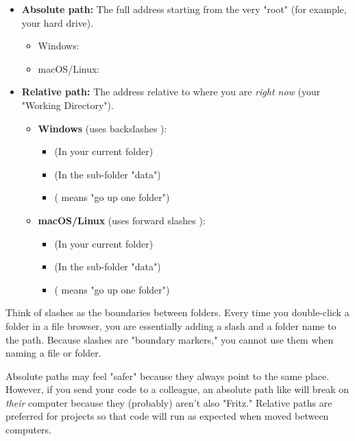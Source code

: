 \begin{itemize}
    \item \textbf{Absolute path:} The full address starting from the very "root" (for example, your hard drive). 
    \begin{itemize}
        \item Windows: 
        \item macOS/Linux: 
    \end{itemize}
    \item \textbf{Relative path:} The address relative to where you are \emph{right now} (your "Working Directory").
    \begin{itemize}
        \item \textbf{Windows} (uses backslashes \filepath{\textbackslash}):
            \begin{itemize}
            \item {} (In your current folder)
            \item {} (In the sub-folder "data")
            \item {} ( means "go up one folder")
            \end{itemize}
        \item \textbf{macOS/Linux} (uses forward slashes \filepath{/}):
            \begin{itemize}
            \item {} (In your current folder)
            \item {} (In the sub-folder "data")
            \item {} ( means "go up one folder")
            \end{itemize}
    \end{itemize}
\end{itemize}

Think of slashes as the boundaries between folders. Every time you double-click a folder in a file browser, you are essentially adding a slash and a folder name to the path. Because slashes are "boundary markers," you cannot use them when naming a file or folder.

\begin{note}
Absolute paths may feel "safer" because they always point to the same place. However, if you send your code to a colleague, an absolute path like  will break on \emph{their} computer because they (probably) aren't also "Fritz." Relative paths are preferred for projects so that code will run as expected when moved between computers.
\end{note}

